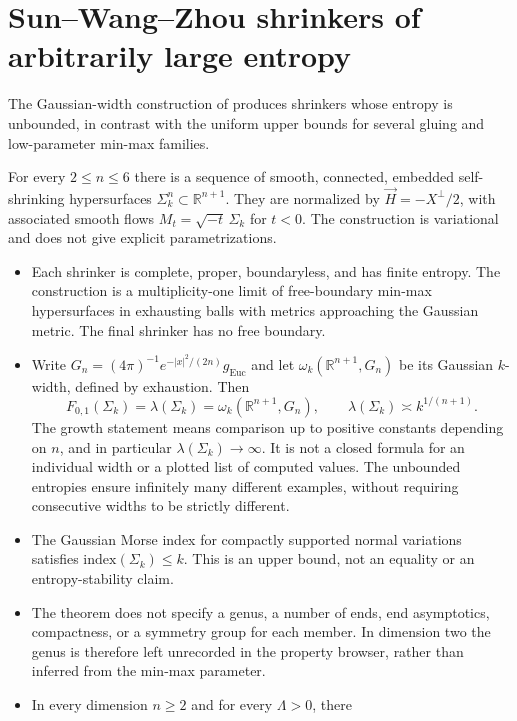 \chapter{Sun--Wang--Zhou shrinkers of arbitrarily large entropy}\label{sec:catalogue-swz-large-entropy}
The Gaussian-width construction of \cite{CatSunWangZhou2024}
produces shrinkers whose entropy is unbounded, in contrast with the
uniform upper bounds for several gluing and low-parameter min-max
families.

\begin{example}\label{ex:catalogue-swz-large-entropy}
For every $2\leq n\leq6$ there is a sequence of smooth, connected,
embedded self-shrinking hypersurfaces $\Sigma_k^n\subset\mathbb R^{n+1}$.
They are normalized by $\vec H=-X^\perp/2$, with associated smooth
flows $M_t=\sqrt{-t}\,\Sigma_k$ for $t<0$. The construction is
variational and does not give explicit parametrizations.
\begin{itemize}
\item Each shrinker is complete, proper, boundaryless, and has finite
entropy. The construction is a multiplicity-one limit of free-boundary
min-max hypersurfaces in exhausting balls with metrics approaching the
Gaussian metric. The final shrinker has no free boundary.
\item Write $G_n=(4\pi)^{-1}e^{-|x|^2/(2n)}g_{\mathrm{Euc}}$ and
let $\omega_k(\mathbb R^{n+1},G_n)$ be its Gaussian $k$-width,
defined by exhaustion. Then
\[
 F_{0,1}(\Sigma_k)=\lambda(\Sigma_k)
 =\omega_k(\mathbb R^{n+1},G_n),\qquad
 \lambda(\Sigma_k)\asymp k^{1/(n+1)}.
\]
The growth statement means comparison up to positive constants
depending on $n$, and in particular $\lambda(\Sigma_k)\to\infty$.
It is not a closed formula for an individual width or a plotted list
of computed values. The unbounded entropies ensure infinitely many
different examples, without requiring consecutive widths to be
strictly different.
\item The Gaussian Morse index for compactly supported normal
variations satisfies $\mathrm{index}(\Sigma_k)\leq k$.
This is an upper bound, not an equality or an entropy-stability claim.
\item The theorem does not specify a genus, a number of ends, end
asymptotics, compactness, or a symmetry group for each member.
In dimension two the genus is therefore left unrecorded in the
property browser, rather than inferred from the min-max parameter.
\item In every dimension $n\geq2$ and for every $\Lambda>0$, there

\end{itemize}
\end{example}
